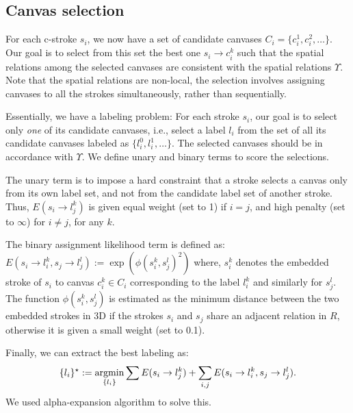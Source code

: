 {\subsection{Canvas selection}

For each c-stroke $s_i$, we now have a set of candidate canvases $C_i = \{c_i^1,c_i^2,\dots\}$. Our goal is to select from this set the best one $s_i \rightarrow c_i^k$ such that the spatial relations among the selected canvases are consistent with the spatial relations $\Upsilon$. Note that the spatial relations are non-local, the selection involves assigning canvases to all the strokes simultaneously, rather than sequentially.

Essentially, we have a labeling problem: For each stroke $s_i$, our goal is to select only {\em one} of its candidate canvases, i.e., select a label $l_i$ from the set of all its candidate canvases labeled as $\{l_i^0,l_i^1,\dots\}$. The selected canvases should be in accordance with $\Upsilon$. We define unary and binary terms to score the selections.

The unary term is to impose a hard constraint that a stroke selects a canvas only from its own label set, and not from the candidate label set of another stroke. Thus,
$E(s_i \rightarrow l_j^k)$ is given equal weight (set to 1) if $i=j$, and high penalty (set to $\infty$) for $i\ne j$, for any $k$.


The binary assignment likelihood term is defined as: $E(s_i \rightarrow l_i^k, s_j \rightarrow l_j^l):= \exp(\phi(s_i^k, s_j^l)^2)$
%
where, $s_i^k$ denotes the embedded stroke of $s_i$ to canvas $c_i^k \in C_i$ corresponding to the label $l_i^k$ and similarly for $s_j^l$. The function $\phi(s_i^k, s_j^l)$ is estimated as the minimum distance between the two embedded strokes in 3{D} if the strokes $s_i$ and $s_j$ share an adjacent relation in $R$, otherwise it is given a small weight (set to 0.1).


Finally, we can extract the best labeling as:
\begin{equation}
\{l_i \}^\star := \operatorname*{argmin}_{ \{l_i \} } \sum E(s_i \rightarrow l_j^k) + \sum_{i,j} E(s_i \rightarrow l_i^k, s_j \rightarrow l_j^l).
\label{eqn:mrf_equation}
\end{equation}
We used alpha-expansion algorithm \cite{Kolmogorov:2004:MRF} to solve this.


}
